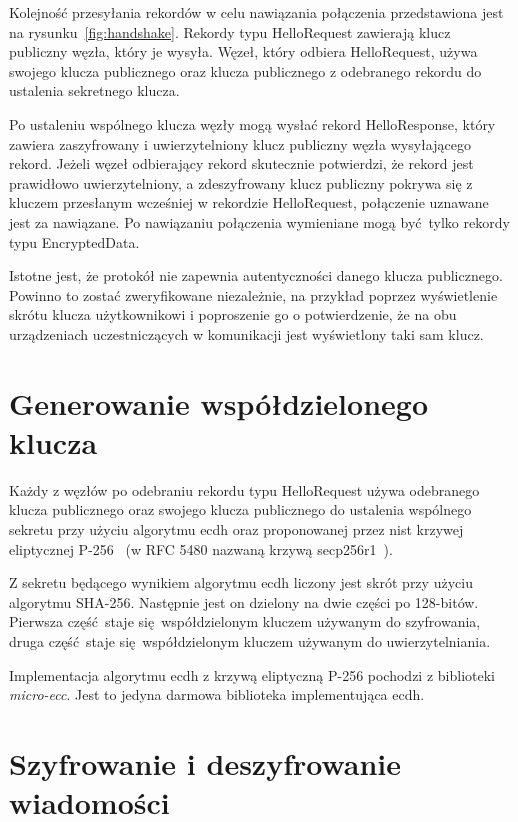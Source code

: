 Kolejność przesyłania rekordów w celu nawiązania połączenia przedstawiona jest na rysunku~\ref{fig:handshake}. Rekordy typu HelloRequest zawierają klucz publiczny węzła, który je wysyła. Węzeł, który odbiera HelloRequest, używa swojego klucza publicznego oraz klucza publicznego z odebranego rekordu do ustalenia sekretnego klucza.

Po ustaleniu wspólnego klucza węzły mogą wysłać rekord HelloResponse, który zawiera zaszyfrowany i uwierzytelniony klucz publiczny węzła wysyłającego rekord. Jeżeli węzeł odbierający rekord skutecznie potwierdzi, że rekord jest prawidłowo uwierzytelniony, a zdeszyfrowany klucz publiczny pokrywa się z kluczem przesłanym wcześniej w rekordzie HelloRequest, połączenie uznawane jest za nawiązane. Po nawiązaniu połączenia wymieniane mogą być tylko rekordy typu EncryptedData.

Istotne jest, że protokół nie zapewnia autentyczności danego klucza publicznego. Powinno to zostać zweryfikowane niezależnie, na przykład poprzez wyświetlenie skrótu klucza użytkownikowi i poproszenie go o potwierdzenie, że na obu urządzeniach uczestniczących w komunikacji jest wyświetlony taki sam klucz.

\section{Generowanie współdzielonego klucza}
\label{sec:sharedkey}

Każdy z węzłów po odebraniu rekordu typu HelloRequest używa odebranego klucza publicznego oraz swojego klucza publicznego do ustalenia wspólnego sekretu przy użyciu algorytmu \gls{ecdh} oraz proponowanej przez \gls{nist} krzywej eliptycznej P-256~\cite{kerry2013digital} (w RFC 5480 nazwaną krzywą secp256r1~\cite{turner2009elliptic}).

Z sekretu będącego wynikiem algorytmu \gls{ecdh} liczony jest skrót przy użyciu algorytmu SHA-256. Następnie jest on dzielony na dwie części po 128-bitów. Pierwsza część staje się współdzielonym kluczem używanym do szyfrowania, druga część staje się współdzielonym kluczem używanym do uwierzytelniania.

Implementacja algorytmu \gls{ecdh} z krzywą eliptyczną P-256 pochodzi z biblioteki \emph{micro-ecc}. Jest to jedyna darmowa biblioteka implementująca \gls{ecdh}.

\section{Szyfrowanie i deszyfrowanie wiadomości}
\label{sec:encrypt}

